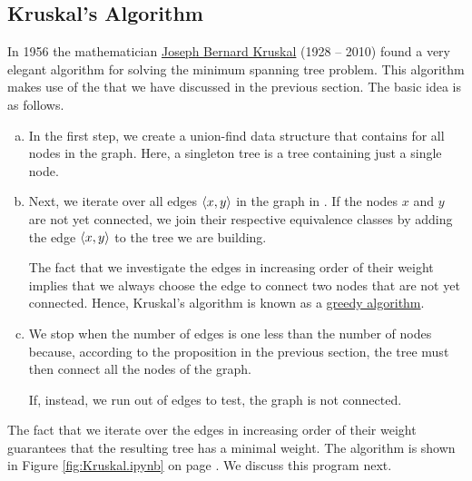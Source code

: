 \subsection{Kruskal's Algorithm}
In 1956 the mathematician \href{https://en.wikipedia.org/wiki/Joseph_Kruskal}{Joseph Bernard Kruskal} (1928 -- 2010) 
found a very elegant algorithm for solving the minimum spanning tree problem.   This algorithm makes use
of the  that we have discussed in the previous section.  The basic idea is as
follows.
\begin{enumerate}[(a)]
\item In the first step, we create a union-find data structure that contains 
      for all nodes in the graph.  Here, a singleton tree is a tree containing just a single node.
\item Next, we iterate over all edges $\pair(x, y)$ in the graph in .
      If the nodes $x$ and $y$ are not yet connected, we join their respective equivalence classes by adding
      the edge $\pair(x, y)$ to the tree we are building.

      The fact that we investigate the edges in increasing order of their weight implies that we always choose
      the  edge to connect two nodes that are not yet connected.  Hence, Kruskal's algorithm is
      known as a \href{https://en.wikipedia.org/wiki/Greedy_algorithm}{greedy algorithm}.
\item We stop when the number of edges is one less than the number of nodes because, according to the
      proposition in the previous section, the tree must then connect all the nodes of the graph.

      If, instead, we run out of edges to test, the graph is not connected.
\end{enumerate}
The fact that we iterate over the edges in increasing order of their weight guarantees that the
resulting tree has a minimal weight.
The algorithm is shown in Figure \ref{fig:Kruskal.ipynb} on page \pageref{fig:Kruskal.ipynb}.  We
discuss this program next.

